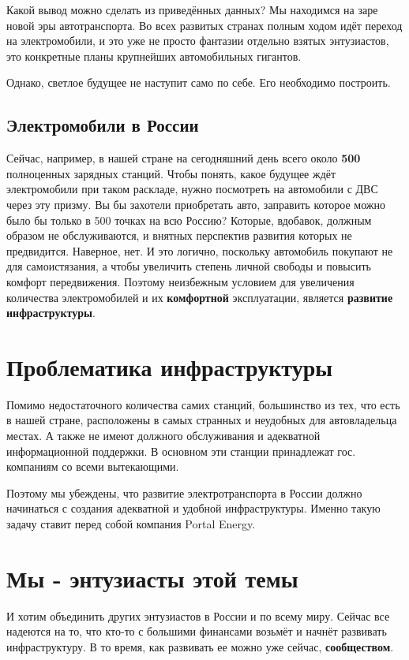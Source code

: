 \documentclass[a4paper,12pt]{report}
\begin{document}
Какой вывод можно сделать из приведённых данных? Мы находимся на заре новой эры автотранспорта. Во всех развитых странах полным ходом идёт переход на электромобили, и это уже не просто фантазии отдельно взятых энтузиастов, это конкретные планы крупнейших автомобильных гигантов. 

Однако, светлое будущее не наступит само по себе. Его необходимо построить. 

\section{Электромобили в России}
Сейчас, например, в нашей стране на сегодняшний день всего около \textbf{500} полноценных зарядных станций. Чтобы понять, какое будущее ждёт электромобили при таком раскладе, нужно посмотреть на автомобили с ДВС через эту призму. Вы бы захотели приобретать авто, заправить которое можно было бы только в 500 точках на всю Россию? Которые, вдобавок, должным образом не обслуживаются, и внятных перспектив развития которых не предвидится. Наверное, нет. И это логично, поскольку автомобиль покупают не для самоистязания, а чтобы увеличить степень личной свободы и повысить комфорт передвижения. Поэтому неизбежным условием для увеличения количества электромобилей и их \textbf{комфортной} эксплуатации, является \textbf{развитие инфраструктуры}. 

\chapter{Проблематика инфраструктуры}
Помимо недостаточного количества самих станций, большинство из тех, что есть в нашей стране, расположены в самых странных и неудобных для автовладельца местах. А также не имеют должного обслуживания и адекватной информационной поддержки. В основном эти станции принадлежат гос. компаниям со всеми вытекающими.

Поэтому мы убеждены, что развитие электротранспорта в России должно начинаться с создания адекватной и удобной инфраструктуры. 
Именно такую задачу ставит перед собой компания Portal Energy.

\chapter{Мы - энтузиасты этой темы}
И хотим объединить других энтузиастов в России и по всему миру. Сейчас все надеются на то, что кто-то с большими финансами возьмёт и начнёт развивать инфраструктуру. В то время, как развивать ее можно уже сейчас, \textbf{сообществом}. 
\end{document}
